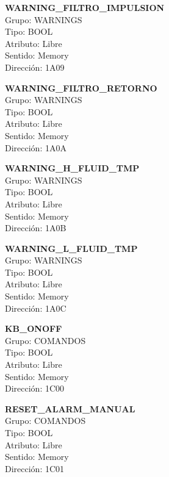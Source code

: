 \vspace{10mm}

\textbf{WARNING\_FILTRO\_IMPULSION}\\Grupo: WARNINGS\\Tipo: BOOL\\Atributo: Libre\\Sentido: Memory\\Dirección: 1A09

\vspace{10mm}

\textbf{WARNING\_FILTRO\_RETORNO}\\Grupo: WARNINGS\\Tipo: BOOL\\Atributo: Libre\\Sentido: Memory\\Dirección: 1A0A

\vspace{10mm}

\textbf{WARNING\_H\_FLUID\_TMP}\\Grupo: WARNINGS\\Tipo: BOOL\\Atributo: Libre\\Sentido: Memory\\Dirección: 1A0B

\vspace{10mm}

\textbf{WARNING\_L\_FLUID\_TMP}\\Grupo: WARNINGS\\Tipo: BOOL\\Atributo: Libre\\Sentido: Memory\\Dirección: 1A0C

\vspace{10mm}

\textbf{KB\_ONOFF}\\Grupo: COMANDOS\\Tipo: BOOL\\Atributo: Libre\\Sentido: Memory\\Dirección: 1C00

\vspace{10mm}

\textbf{RESET\_ALARM\_MANUAL}\\Grupo: COMANDOS\\Tipo: BOOL\\ Atributo: Libre\\Sentido: Memory\\Dirección: 1C01

